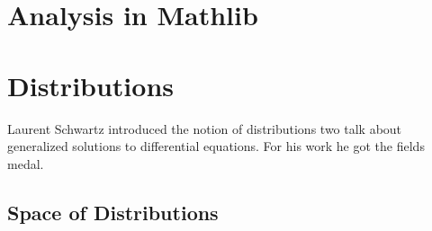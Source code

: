 
\chapter{Analysis in Mathlib}
\label{chap:analysis-mathlib}




%
%
%
%

\chapter{Distributions}
Laurent Schwartz introduced the notion of distributions two talk about generalized solutions to differential equations. For his work he got the fields medal.

\section{Space of Distributions}

